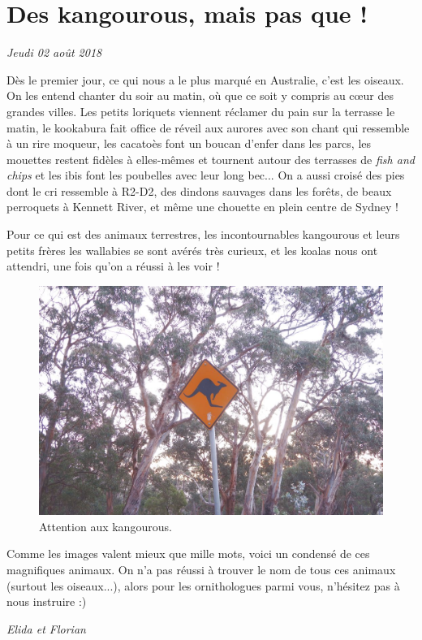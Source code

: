 \hypertarget{des-kangourous-mais-pas-que}{%
\section{Des kangourous, mais pas que
!}\label{des-kangourous-mais-pas-que}}

\emph{Jeudi 02 août 2018}

Dès le premier jour, ce qui nous a le plus marqué en Australie, c'est
les oiseaux. On les entend chanter du soir au matin, où que ce soit y
compris au cœur des grandes villes. Les petits loriquets viennent
réclamer du pain sur la terrasse le matin, le kookabura fait office de
réveil aux aurores avec son chant qui ressemble à un rire moqueur, les
cacatoès font un boucan d'enfer dans les parcs, les mouettes restent
fidèles à elles-mêmes et tournent autour des terrasses de \emph{fish and
chips} et les ibis font les poubelles avec leur long bec... On a aussi
croisé des pies dont le cri ressemble à R2-D2, des dindons sauvages dans
les forêts, de beaux perroquets à Kennett River, et même une chouette en
plein centre de Sydney !

Pour ce qui est des animaux terrestres, les incontournables kangourous
et leurs petits frères les wallabies se sont avérés très curieux, et les
koalas nous ont attendri, une fois qu'on a réussi à les voir !

\begin{figure}
\centering
\includegraphics{images/20180802_kangourou.JPG}
\caption{Attention aux kangourous.}
\end{figure}

Comme les images valent mieux que mille mots, voici un condensé de ces
magnifiques animaux. On n'a pas réussi à trouver le nom de tous ces
animaux (surtout les oiseaux...), alors pour les ornithologues parmi
vous, n'hésitez pas à nous instruire :)

\emph{Elida et Florian}

